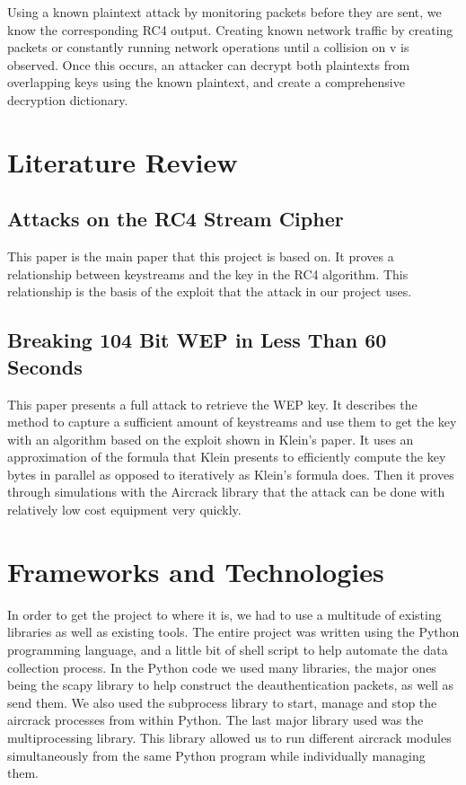 \documentclass[10pt, titlepage]{article}
\begin{document}
Using a known plaintext attack by monitoring packets before they are sent, we know the corresponding RC4 output. Creating known network traffic by creating packets or constantly running network operations until a collision on v is observed. Once this occurs, an attacker can decrypt both plaintexts from overlapping keys using the known plaintext, and create a comprehensive decryption dictionary. 



\section{Literature Review}
\subsection{Attacks on the RC4 Stream Cipher \cite{klein}}
This paper is the main paper that this project is based on. It proves a relationship between keystreams and the key in the RC4 algorithm. This relationship is the basis of the exploit that the attack in our project uses. 

\subsection{Breaking 104 Bit WEP in Less Than 60 Seconds \cite{mainPaper}}
This paper presents a full attack to retrieve the WEP key. It describes the method to capture a sufficient amount of keystreams and use them to get the key with an algorithm based on the exploit shown in Klein's paper. It uses an approximation of the formula that Klein presents to efficiently compute the key bytes in parallel as opposed to iteratively as Klein's formula does. Then it proves through simulations with the Aircrack library that the attack can be done with relatively low cost equipment very quickly. 

\section{Frameworks and Technologies}
In order to get the project to where it is, we had to use a multitude of existing libraries as well as existing tools. The entire project was written using the Python programming language, and a little bit of shell script to help automate the data collection process. In the Python code we used many libraries, the major ones being the scapy library to help construct the deauthentication packets, as well as send them. We also used the subprocess library to start, manage and stop the aircrack processes from within Python. The last major library used was the multiprocessing library. This library allowed us to run different aircrack modules simultaneously from the same Python program while individually managing them. \\
\end{document}
